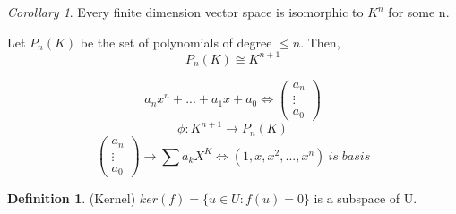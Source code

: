 \documentclass[12pt]{article}
\theoremstyle{definition}
\newtheorem{definition}{Definition}[section]
\theoremstyle{remark}
\newtheorem{corollary}{Corollary}[theorem]
\begin{document}
    \begin{corollary}
        Every finite dimension vector space is isomorphic to $K^n$ for some n.
    \end{corollary}

    \begin{example}
        Let $P_n(K)$ be the set of polynomials of degree $\leq n$. Then, $$P_n(K) \cong K^{n+1}$$

        $$a_nx^n +...+a_1x+ a_0 \iff \begin{pmatrix}
            a_n \\ \vdots \\ a_0 
        \end{pmatrix}$$ 
        $$\phi : K^{n+1}\rightarrow P_n(K)$$
        $$\begin{pmatrix}
            a_n \\ \vdots \\ a_0 
        \end{pmatrix} \rightarrow \sum a_k X^K \iff (1, x, x^2,..., x^n) \: is \; basis$$
    \end{example}
    \begin{definition}(Kernel)
        $ker(f) = \{u\in U : f(u)=0\}$ is a subspace of U.
        
    \end{definition}
\end{document}
